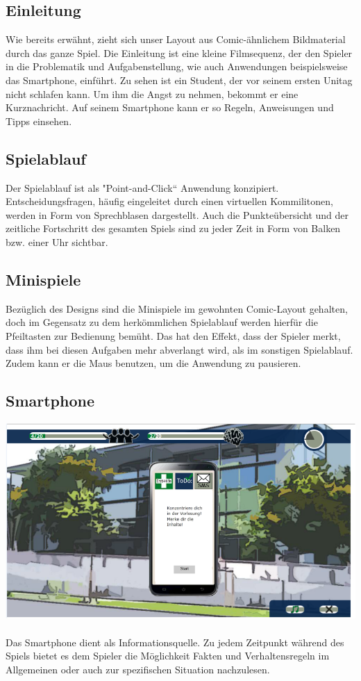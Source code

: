 \documentclass[a4paper, 11pt]{article} %
\begin{document}
\subsection{Einleitung}
Wie bereits erwähnt, zieht sich unser Layout aus Comic-ähnlichem Bildmaterial durch das ganze Spiel. Die Einleitung ist eine kleine Filmsequenz, der den Spieler in die Problematik und Aufgabenstellung, wie auch Anwendungen beispielsweise das Smartphone, einführt. Zu sehen ist ein Student, der vor seinem ersten Unitag nicht schlafen kann. Um ihm die Angst zu nehmen, bekommt er eine Kurznachricht. Auf seinem Smartphone kann er so Regeln, Anweisungen und Tipps einsehen.

\subsection{Spielablauf}
Der Spielablauf ist als "Point-and-Click“ Anwendung konzipiert. Entscheidungsfragen, häufig eingeleitet durch einen virtuellen Kommilitonen, werden in Form von Sprechblasen dargestellt.
Auch die Punkteübersicht und der zeitliche Fortschritt des gesamten Spiels sind zu jeder Zeit in Form von Balken bzw. einer Uhr sichtbar.

\subsection{Minispiele}
Bezüglich des Designs sind die Minispiele im gewohnten Comic-Layout gehalten, doch im Gegensatz zu dem herkömmlichen Spielablauf werden hierfür die Pfeiltasten zur Bedienung bemüht. Das hat den Effekt, dass der Spieler merkt, dass ihm bei diesen Aufgaben mehr abverlangt wird, als im sonstigen Spielablauf. Zudem kann er die Maus benutzen, um die Anwendung zu pausieren.

\subsection{Smartphone}
\includegraphics[scale=0.535]{images/spiel/4.png}\\\\
Das Smartphone dient als Informationsquelle. Zu jedem Zeitpunkt während des Spiels bietet es dem Spieler die Möglichkeit Fakten und Verhaltensregeln im Allgemeinen oder auch zur spezifischen Situation nachzulesen.
\end{document}
